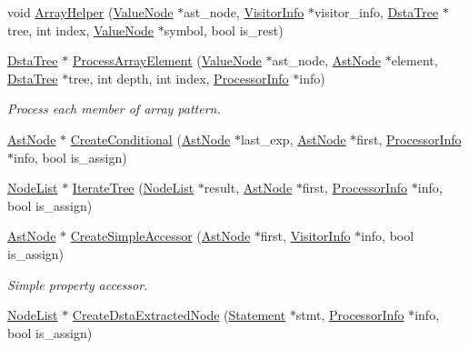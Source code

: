 \begin{DoxyCompactItemize}
void \hyperlink{namespacemocha_a1e0321e63212cb250b296eb1958fde95}{ArrayHelper} (\hyperlink{classmocha_1_1_value_node}{ValueNode} $\ast$ast\_\-node, \hyperlink{classmocha_1_1_visitor_info}{VisitorInfo} $\ast$visitor\_\-info, \hyperlink{classmocha_1_1_dsta_tree}{DstaTree} $\ast$tree, int index, \hyperlink{classmocha_1_1_value_node}{ValueNode} $\ast$symbol, bool is\_\-rest)
\item 
\hyperlink{classmocha_1_1_dsta_tree}{DstaTree} $\ast$ \hyperlink{namespacemocha_af8a6e0cfa8b0cf7abe9b684eec0cfcef}{ProcessArrayElement} (\hyperlink{classmocha_1_1_value_node}{ValueNode} $\ast$ast\_\-node, \hyperlink{classmocha_1_1_ast_node}{AstNode} $\ast$element, \hyperlink{classmocha_1_1_dsta_tree}{DstaTree} $\ast$tree, int depth, int index, \hyperlink{classmocha_1_1_processor_info}{ProcessorInfo} $\ast$info)
\begin{DoxyCompactList}\small\item\em Process each member of array pattern. \end{DoxyCompactList}\item 
\hyperlink{classmocha_1_1_ast_node}{AstNode} $\ast$ \hyperlink{namespacemocha_a112c49bb7f4b348cfb03ece35ee1c97a}{CreateConditional} (\hyperlink{classmocha_1_1_ast_node}{AstNode} $\ast$last\_\-exp, \hyperlink{classmocha_1_1_ast_node}{AstNode} $\ast$first, \hyperlink{classmocha_1_1_processor_info}{ProcessorInfo} $\ast$info, bool is\_\-assign)
\item 
\hyperlink{classmocha_1_1_node_list}{NodeList} $\ast$ \hyperlink{namespacemocha_a7f88242dd7a314683af9e25a253575ec}{IterateTree} (\hyperlink{classmocha_1_1_node_list}{NodeList} $\ast$result, \hyperlink{classmocha_1_1_ast_node}{AstNode} $\ast$first, \hyperlink{classmocha_1_1_processor_info}{ProcessorInfo} $\ast$info, bool is\_\-assign)
\item 
\hyperlink{classmocha_1_1_ast_node}{AstNode} $\ast$ \hyperlink{namespacemocha_aa1c1e8405ca6a36492f0ae4b6f6f5a88}{CreateSimpleAccessor} (\hyperlink{classmocha_1_1_ast_node}{AstNode} $\ast$first, \hyperlink{classmocha_1_1_visitor_info}{VisitorInfo} $\ast$info, bool is\_\-assign)
\begin{DoxyCompactList}\small\item\em Simple property accessor. \end{DoxyCompactList}\item 
\hyperlink{classmocha_1_1_node_list}{NodeList} $\ast$ \hyperlink{namespacemocha_acd5c53aedeb5b13ad796ff32a95e6ac3}{CreateDstaExtractedNode} (\hyperlink{classmocha_1_1_statement}{Statement} $\ast$stmt, \hyperlink{classmocha_1_1_processor_info}{ProcessorInfo} $\ast$info, bool is\_\-assign)

\end{DoxyCompactItemize}
